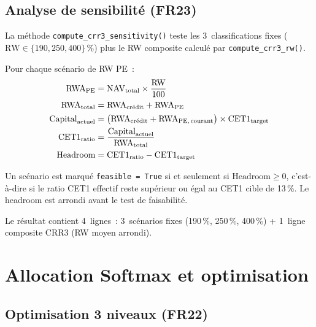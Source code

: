 \documentclass[12pt,a4paper]{article}
\begin{document}
\subsection{Analyse de sensibilit\'e (FR23)}

La m\'ethode \texttt{compute\_crr3\_sensitivity()} teste les 3~classifications fixes ($\text{RW} \in \{190, 250, 400\}\,\%$) plus le RW composite calcul\'e par \texttt{compute\_crr3\_rw()}.

\begin{formulebox}
Pour chaque sc\'enario de RW PE~:
\begin{align}
    \text{RWA}_{\text{PE}} &= \text{NAV}_{\text{total}} \times \frac{\text{RW}}{100} \label{eq:rwa_pe} \\
    \text{RWA}_{\text{total}} &= \text{RWA}_{\text{cr\'edit}} + \text{RWA}_{\text{PE}} \label{eq:rwa_total} \\
    \text{Capital}_{\text{actuel}} &= \bigl(\text{RWA}_{\text{cr\'edit}} + \text{RWA}_{\text{PE,\,courant}}\bigr) \times \text{CET1}_{\text{target}} \label{eq:capital_actuel} \\
    \text{CET1}_{\text{ratio}} &= \frac{\text{Capital}_{\text{actuel}}}{\text{RWA}_{\text{total}}} \label{eq:cet1_ratio} \\
    \text{Headroom} &= \text{CET1}_{\text{ratio}} - \text{CET1}_{\text{target}} \label{eq:headroom}
\end{align}
\end{formulebox}

\begin{definitionbox}
Un sc\'enario est marqu\'e \texttt{feasible = True} si et seulement si $\text{Headroom} \geq 0$, c'est-\`a-dire si le ratio CET1 effectif reste sup\'erieur ou \'egal au CET1 cible de 13\,\%. Le headroom est arrondi avant le test de faisabilit\'e.
\end{definitionbox}

Le r\'esultat contient 4~lignes~: 3~sc\'enarios fixes (190\,\%, 250\,\%, 400\,\%) + 1~ligne composite CRR3 (RW moyen arrondi).

\section{Allocation Softmax et optimisation}
\label{sec:softmax}

\subsection{Optimisation 3 niveaux (FR22)}
\end{document}
